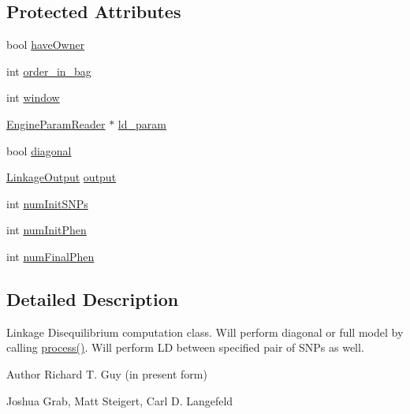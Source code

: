 \subsection*{Protected Attributes}
\begin{DoxyCompactItemize}
\item 
bool \hyperlink{classLinkageDisequilibrium_a1de71d86c97f892f29d165e2d37181b2}{haveOwner}
\item 
int \hyperlink{classLinkageDisequilibrium_a6bb08acf924aa961700b802095ff697e}{order\_\-in\_\-bag}
\item 
int \hyperlink{classLinkageDisequilibrium_af2487209d065ab6f7286beb76bc6b239}{window}
\item 
\hyperlink{classEngineParamReader}{EngineParamReader} $\ast$ \hyperlink{classLinkageDisequilibrium_a8b4887ba11facc45a5a4a84dea191db9}{ld\_\-param}
\item 
bool \hyperlink{classLinkageDisequilibrium_a635279ff05e69333abc2391b3a085d0c}{diagonal}
\item 
\hyperlink{classLinkageOutput}{LinkageOutput} \hyperlink{classLinkageDisequilibrium_ac3844fe848ba87fe5d26e12d7c6f20d8}{output}
\item 
int \hyperlink{classLinkageDisequilibrium_ab1132cf2922b184a6ba21c5c4b6c8a43}{numInitSNPs}
\item 
int \hyperlink{classLinkageDisequilibrium_afb85fd66b53951f9ea57ef0835a93260}{numInitPhen}
\item 
int \hyperlink{classLinkageDisequilibrium_a5f5bf8027d2e4a7cbac182d39014f93f}{numFinalPhen}
\end{DoxyCompactItemize}


\subsection{Detailed Description}
Linkage Disequilibrium computation class. Will perform diagonal or full model by calling \hyperlink{classLinkageDisequilibrium_a821abc8314c8e6bddc1dfcdf24bdda09}{process()}. Will perform LD between specified pair of SNPs as well.

\begin{DoxyAuthor}{Author}
Richard T. Guy (in present form) 

Joshua Grab, Matt Steigert, Carl D. Langefeld 
\end{DoxyAuthor}


